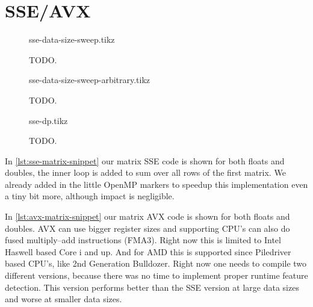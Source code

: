 \documentclass[final]{report}
\begin{document}
\chapter{SSE/AVX}

\begin{figure}[H]
\centering
    \setlength\figureheight{8cm}
    \setlength\figurewidth{\linewidth}
    {sse-data-size-sweep.tikz}
    \caption{TODO.}
    \label{fig:sse-data-size-sweep}
\end{figure}

\begin{figure}[H]
\centering
    \setlength\figureheight{8cm}
    \setlength\figurewidth{\linewidth}
    {sse-data-size-sweep-arbitrary.tikz}
    \caption{TODO.}
    \label{fig:sse-data-size-sweep-arbitrary}
\end{figure}

\begin{figure}[H]
\centering
    \setlength\figureheight{8cm}
    \setlength\figurewidth{\linewidth}
    {sse-dp.tikz}
    \caption{TODO.}
    \label{fig:sse-dp}
\end{figure}

In \cref{lst:sse-matrix-snippet} our matrix SSE code is shown for both floats and doubles, the inner loop is added to sum over all rows of the first matrix. We already added in the little OpenMP markers to speedup this implementation even a tiny bit more, although impact is negligible.

In \cref{lst:avx-matrix-snippet} our matrix AVX code is shown for both floats and doubles.
AVX can use bigger register sizes and supporting CPU's can also do fused multiply–add instructions (FMA3).
Right now this is limited to Intel Haswell based Core i and up.
And for AMD this is supported since Piledriver based CPU's, like 2nd Generation Bulldozer. 
Right now one needs to compile two different versions, because there was no time to implement proper runtime feature detection.
This version performs better than the SSE version at large data sizes and worse at smaller data sizes. 

\end{document}
